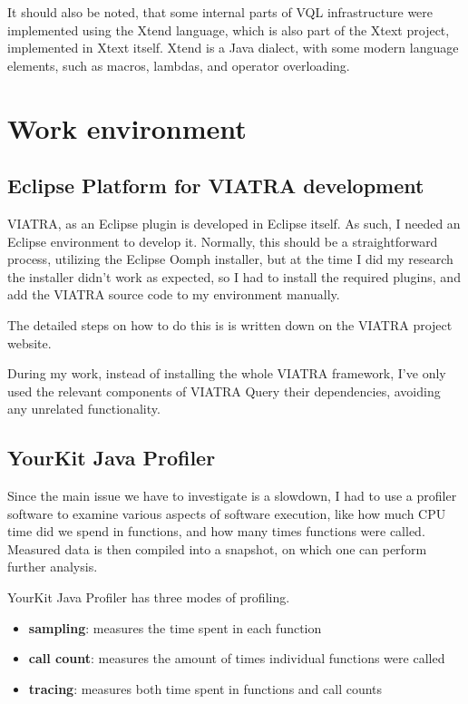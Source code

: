 \documentclass[11pt,a4paper,oneside]{report}
\begin{document}
It should also be noted, that some internal parts of VQL infrastructure were
implemented using the Xtend language, which is also part of the Xtext project,
implemented in Xtext itself. Xtend is a Java dialect, with some modern language
elements, such as macros, lambdas, and operator overloading\cite{xtend}.

\section{Work environment}


\subsection{Eclipse Platform for VIATRA development}
VIATRA, as an Eclipse plugin is developed in Eclipse itself. As such, I needed
an Eclipse environment to develop it. Normally, this should be a straightforward
process, utilizing the Eclipse Oomph installer, but at the time I did my
research the installer didn't work as expected, so I had to install the required
plugins, and add the VIATRA source code to my environment manually.

The detailed steps on how to do this is is written down on the VIATRA project
website\cite{ujhelyi_harmath_david_nagy_hegedus_2019}.

During my work, instead of installing the whole VIATRA framework, I've only
used the relevant components of VIATRA Query their dependencies, avoiding any
unrelated functionality.

\subsection{YourKit Java Profiler}
Since the main issue we have to investigate is a slowdown, I had to use a
profiler software to examine various aspects of software execution, like how
much CPU time did we spend in functions, and how many times functions were
called. Measured data is then compiled into a snapshot, on which one can perform
further analysis.

YourKit Java Profiler has three modes of profiling.
\begin{itemize}
    \item{\textbf{sampling}: measures the time spent in each function}
    \item{\textbf{call count}: measures the amount of times individual functions were called}
    \item{\textbf{tracing}: measures both time spent in functions and call counts}
\end{itemize}
\end{document}
